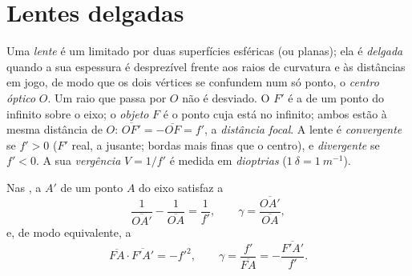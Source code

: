\section{Lentes delgadas}

\begin{definition}\label{def:b1:mirrors-thin-lenses:lens}
Uma \emph{lente} é um  limitado por duas superfícies esféricas (ou
planas); ela é \emph{delgada} quando a sua espessura é desprezível
frente aos raios de curvatura e às distâncias em jogo, de modo que os dois
vértices se confundem num só ponto, o \emph{centro óptico} $O$. Um raio
que passa por $O$ não é desviado. O \emph{ } $F'$ é a 
de um ponto do infinito sobre o eixo; o \emph{ objeto} $F$ é o
ponto cuja  está no infinito; ambos estão à mesma distância de
$O$: $\overline{OF'} = -\overline{OF} = f'$, a \emph{distância focal}.
A lente é \emph{convergente} se $f' > 0$ ($F'$ real, a jusante; bordas
mais finas que o centro), e \emph{divergente} se $f' < 0$. A sua
\emph{vergência} $V = 1/f'$ é medida em \emph{dioptrias}
($\qty{1}{\delta} = \qty{1}{m^{-1}}$).
\end{definition}

\begin{theorem}\label{thm:b1:mirrors-thin-lenses:lensconj}
Nas , a  $A'$ de um ponto $A$ do eixo
satisfaz a 
\[
\frac{1}{\overline{OA'}} - \frac{1}{\overline{OA}} = \frac{1}{f'},
\qquad
\gamma = \frac{\overline{OA'}}{\overline{OA}},
\]
e, de modo equivalente, a 
\[
\overline{FA}\cdot\overline{F'A'} = -f'^2,
\qquad
\gamma = \frac{f'}{\overline{FA}} = -\frac{\overline{F'A'}}{f'} .
\]
\end{theorem}

